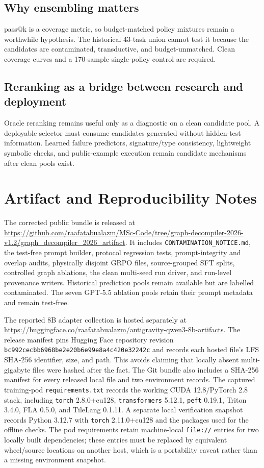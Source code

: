 \documentclass[11pt]{article}
\begin{document}
\subsection{Why ensembling matters}

pass@k is a coverage metric, so budget-matched policy mixtures remain a worthwhile hypothesis. The historical 43-task union cannot test it because the candidates are contaminated, transductive, and budget-unmatched. Clean coverage curves and a 170-sample single-policy control are required.

\subsection{Reranking as a bridge between research and deployment}

Oracle reranking remains useful only as a diagnostic on a clean candidate pool. A deployable selector must consume candidates generated without hidden-test information. Learned failure predictors, signature/type consistency, lightweight symbolic checks, and public-example execution remain candidate mechanisms after clean pools exist.

\section{Artifact and Reproducibility Notes}

The corrected public bundle is released at \url{https://github.com/raafatabualazm/MSc-Code/tree/graph-decompiler-2026-v1.2/graph_decompiler_2026_artifact}. It includes \texttt{CONTAMINATION\_NOTICE.md}, the test-free prompt builder, protocol regression tests, prompt-integrity and overlap audits, physically disjoint GRPO files, source-grouped SFT splits, controlled graph ablations, the clean multi-seed run driver, and run-level provenance writers. Historical prediction pools remain available but are labelled contaminated. The seven GPT-5.5 ablation pools retain their prompt metadata and remain test-free.

The reported 8B adapter collection is hosted separately at \url{https://huggingface.co/raafatabualazm/antigravity-qwen3-8b-artifacts}. The release manifest pins Hugging Face repository revision \texttt{bc992cecbb6968be2e20b6e99e8a4c420e32242c} and records each hosted file's LFS SHA-256 identifier, size, and path. This avoids claiming that locally absent multi-gigabyte files were hashed after the fact. The Git bundle also includes a SHA-256 manifest for every released local file and two environment records. The captured training-pod \texttt{requirements.txt} records the working CUDA 12.8/PyTorch 2.8 stack, including \texttt{torch} 2.8.0+cu128, \texttt{transformers} 5.12.1, \texttt{peft} 0.19.1, Triton 3.4.0, FLA 0.5.0, and TileLang 0.1.11. A separate local verification snapshot records Python 3.12.7 with \texttt{torch} 2.11.0+cu128 and the packages used for the offline checks. The pod requirements retain machine-local \texttt{file://} entries for two locally built dependencies; these entries must be replaced by equivalent wheel/source locations on another host, which is a portability caveat rather than a missing environment snapshot.
\end{document}
